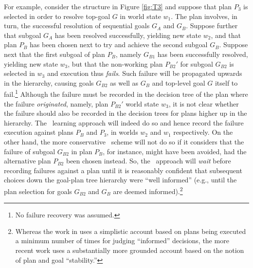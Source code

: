 For example, consider the structure in Figure \ref{fig:T3} and suppose that plan
$P_3$ is selected in order to resolve top-goal $G$ in world state $w_1$. The plan
involves, in turn, the successful resolution of sequential goals $G_A$ and $G_B$.
Suppose further that subgoal $G_A$ has been resolved successfully, yielding new
state $w_2$, and that plan $P_B$ has been chosen next to try and achieve the
second subgoal $G_B$.
Suppose next that the first subgoal of plan $P_B$, namely $G_{B1}$ has been
successfully resolved, yielding new state $w_3$, but that the non-working plan
$P_{B2}'$ for subgoal $G_{B2}$ is selected in $w_3$ and execution thus
\emph{fails}.
Such failure will be propagated upwards in the hierarchy, causing goals $G_{B2}$
as well as $G_B$ and top-level goal $G$ itself to fail.\footnote{No failure
recovery was assumed.}
Although the failure must be recorded in the decision tree of the plan where the
failure \emph{originated}, namely, plan $P_{B2}'$ world state $w_3$, it is not
clear whether the failure should also be recorded in the decision trees for plans
higher up in the hierarchy.
The \CL\ learning approach will indeed do so and hence record the failure
execution against plans $P_B$ and $P_3$, in worlds $w_2$ and $w_1$ respectively.
On the other hand, the more conservative \BUL\ scheme will not do so if it
considers that the failure of subgoal $G_{B2}$ in plan $P_B$, for instance, might
have been avoided, had the alternative plan $P_{B2}$ been chosen instead.
So, the \BUL\ approach will \emph{wait} before recording failures against a plan
until it is reasonably confident that subsequent choices down the goal-plan tree
hierarchy were ``well informed'' (e.g., until the plan selection for goals
$G_{B2}$ and $G_B$ are deemed informed).\footnote{Whereas the work in
\cite{Airiau:IJAT:09} uses a simplistic account based on plans being executed a
minimum number of times for judging ``informed'' decisions, the more recent work
\cite{Singh:AAMAS10} uses a substantially more grounded account based on the
notion of plan and goal ``stability.''}

% 
% 

